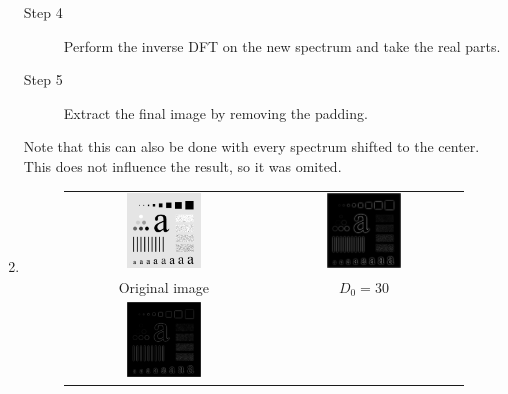 \documentclass[a4paper]{article}
\begin{document}
\begin{enumerate}
\begin{description}
\item[Step 4] Perform the inverse DFT on the new spectrum and take the real parts.
\item[Step 5] Extract the final image by removing the padding.
\end{description}
Note that this can also be done with every spectrum shifted to the center.
This does not influence the result, so it was omited.

\item
\begin{figure}[H]
\centering
\begin{tabular}{cc}
    \includegraphics[width=0.4\textwidth]{../lab2ex1/characters.png} &
    \includegraphics[width=0.4\textwidth]{../lab2ex2/characters-GHPF-D30.png} \\
    Original image & $D_{0} = 30$ \\
    \includegraphics[width=0.4\textwidth]{../lab2ex2/characters-GHPF-D60.png} &

\end{tabular}
\end{figure}
\end{enumerate}
\end{document}
